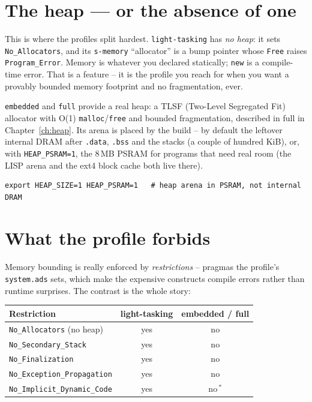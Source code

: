 \section{The heap --- or the absence of one}

This is where the profiles split hardest. \texttt{light-tasking} has \emph{no heap}:
it sets \texttt{No\_Allocators}, and its \texttt{s-memory} ``allocator'' is a bump
pointer whose \texttt{Free} raises \texttt{Program\_Error}. Memory is whatever you
declared statically; \texttt{new} is a compile-time error. That is a feature -- it
is the profile you reach for when you want a provably bounded memory footprint and
no fragmentation, ever.

\texttt{embedded} and \texttt{full} provide a real heap: a TLSF (Two-Level
Segregated Fit) allocator with O(1) \texttt{malloc}/\texttt{free} and bounded
fragmentation, described in full in Chapter~\ref{ch:heap}. Its arena is placed by
the build -- by default the leftover internal DRAM after \texttt{.data},
\texttt{.bss} and the stacks (a couple of hundred KiB), or, with
\texttt{HEAP\_PSRAM=1}, the 8\,MB PSRAM for programs that need real room (the LISP
arena and the ext4 block cache both live there).

\begin{lstlisting}[style=sh]
export HEAP_SIZE=1 HEAP_PSRAM=1   # heap arena in PSRAM, not internal DRAM
\end{lstlisting}

\section{What the profile forbids}

Memory bounding is really enforced by \emph{restrictions} -- pragmas the profile's
\texttt{system.ads} sets, which make the expensive constructs compile errors rather
than runtime surprises. The contrast is the whole story:

\begin{center}
\begin{tabular}{l c c}
\toprule
\textbf{Restriction} & \textbf{light-tasking} & \textbf{embedded / full} \\ \midrule
\texttt{No\_Allocators} (no heap)            & yes & no \\
\texttt{No\_Secondary\_Stack}                & yes & no \\
\texttt{No\_Finalization}                    & yes & no \\
\texttt{No\_Exception\_Propagation}          & yes & no \\
\texttt{No\_Implicit\_Dynamic\_Code}         & yes & no\,$^{*}$ \\
\bottomrule
\end{tabular}
\end{center}

